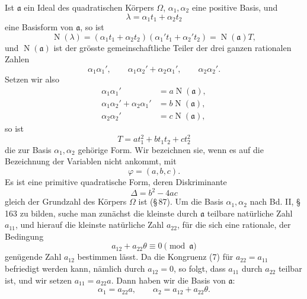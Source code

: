 \documentclass[11pt]{article}
\newcommand{\Norm}{\operatorname{N}}
\begin{document}
Ist $\mathfrak a$ ein Ideal des quadratischen Körpers $\Omega$, $\alpha_1,\alpha_2$ eine positive Basis, und
\begin{equation}
 \lambda=\alpha_1t_1+\alpha_2t_2
\tag{1}
\end{equation}
eine Basisform von $\mathfrak a$, so ist
\begin{equation}
 \Norm(\lambda)=(\alpha_1t_1+\alpha_2t_2)(\alpha_1't_1+\alpha_2't_2)=\Norm(\mathfrak a)T,
\tag{2}
\end{equation}
und $\Norm(\mathfrak a)$ ist der grösste gemeinschaftliche Teiler der drei ganzen rationalen Zahlen
\[
 \alpha_1\alpha_1',\qquad \alpha_1\alpha_2'+\alpha_2\alpha_1',\qquad \alpha_2\alpha_2'.
\]
Setzen wir also
\begin{equation}
\begin{aligned}
\alpha_1\alpha_1'&=a\Norm(\mathfrak a),\\
\alpha_1\alpha_2'+\alpha_2\alpha_1'&=b\Norm(\mathfrak a),\\
\alpha_2\alpha_2'&=c\Norm(\mathfrak a),
\end{aligned}
\tag{3}
\end{equation}
so ist
\begin{equation}
T=at_1^2+bt_1t_2+ct_2^2
\tag{4}
\end{equation}
die zur Basis $\alpha_1,\alpha_2$ gehörige Form. Wir bezeichnen sie, wenn es auf die Bezeichnung der Variablen nicht ankommt, mit
\begin{equation}
 \varphi=(a,b,c).
\tag{5}
\end{equation}
Es ist eine primitive quadratische Form, deren Diskriminante
\begin{equation}
 \Delta=b^2-4ac
\tag{6}
\end{equation}
gleich der Grundzahl des Körpers $\Omega$ ist (\S\,87). Um die Basis $\alpha_1,\alpha_2$ nach Bd. II, \S\,163 zu bilden, suche man zunächst die kleinste durch $\mathfrak a$ teilbare natürliche Zahl $a_{11}$, und hierauf die kleinste natürliche Zahl $a_{22}$, für die sich eine rationale, der Bedingung
\begin{equation}
 a_{12}+a_{22}\theta\equiv0\pmod{\mathfrak a}
\tag{7}
\end{equation}
genügende Zahl $a_{12}$ bestimmen lässt. Da die Kongruenz (7) für $a_{22}=a_{11}$ befriedigt werden kann, nämlich durch $a_{12}=0$, so folgt, dass $a_{11}$ durch $a_{22}$ teilbar ist, und wir setzen $a_{11}=a_{22}a$. Dann haben wir die Basis von $\mathfrak a$:
\begin{equation}
 \alpha_1=a_{22}a,
 \qquad
 \alpha_2=a_{12}+a_{22}\theta.
\tag{8}
\end{equation}
\end{document}
